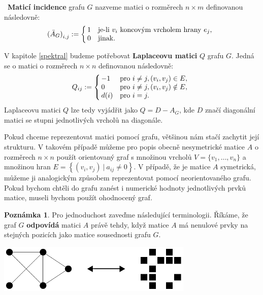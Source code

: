 \documentclass[11pt,american,czech,oneside]{book}
\theoremstyle{plain}
\theoremstyle{definition}
\newtheorem{remark}{Poznámka}
\begin{document}
 \textbf{Maticí incidence} grafu $G$ nazveme matici o rozměrech $n \times m$  definovanou následovně:
\[
  {(\bar{A}_G)}_{i,j} :=
  \left\{
	  \begin{array}{@{\,}ll}
		  1  & \mbox{je-li $v_i$ koncovým vrcholem hrany $e_j$,} \\
		  0  & \mbox{jinak.}
	  \end{array}
  \right.
\]

V kapitole \ref{spektral} budeme potřebovat \textbf{Laplaceovu matici} $Q$ grafu $G$. Jedná se o matici o rozměrech $n \times n$ definovanou následovně:
\[
Q_{ij} :=
\left\{
	\begin{array}{@{\,}ll}
		-1  & \mbox{pro } i \neq j, (v_i,v_j) \in E, \\
		0 & \mbox{pro } i \neq j, (v_i,v_j) \notin E,\\
        d(i) & \mbox{pro } i = j.
	\end{array}
\right.
\]
Laplaceovu matici $Q$ lze tedy vyjádřit jako $Q = D - A_G$, kde $D$  značí diagonální matici se stupni jednotlivých vrcholů na diagonále.

\medskip

Pokud chceme reprezentovat matici pomocí grafu, většinou nám stačí zachytit její strukturu. V takovém případě můžeme pro popis obecně nesymetrické matice $A$ o rozměrech $n \times n$ použít orientovaný graf s množinou vrcholů $V = \{v_1,\ldots,v_n\}$ a množinou hran $E =\left\{(v_i,v_j) \ | \ a_{ij}\neq 0\right\}$. V případě, že je matice $A$ symetrická, můžeme ji analogickým způsobem reprezentovat pomocí neorientovaného grafu.
Pokud bychom chtěli do grafu zanést i numerické hodnoty jednotlivých prvků matice, museli bychom použít ohodnocený graf.

\begin{remark}
  Pro jednoduchost zaveďme následující terminologii. Říkáme, že graf $G$ \textbf{odpovídá} matici $A$ právě tehdy, když matice $A$ má nenulové prvky na stejných pozicích jako matice sousednosti grafu $G$.
\end{remark}

\bigskip
{
  \centering
  \includegraphics[width=0.7\textwidth]{pictures/matgr.pdf}
}
\bigskip
\end{document}
